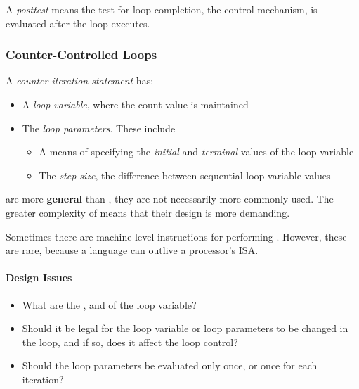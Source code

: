 \begin{definition}[Posttest]\label{def:Iterative_Statement-Posttest_Control}
  A \emph{posttest}  means the test for loop completion, the control mechanism, is evaluated after the loop  executes.
\end{definition}

\subsubsection{Counter-Controlled Loops}\label{subsubsec:Counter_Controlled_Loops}
\begin{definition}\label{def:Counter_Iteration_Statement}
  A \emph{counter iteration statement} has:
  \begin{itemize}[noitemsep]
  \item A \emph{loop variable}, where the count value is maintained
  \item The \emph{loop parameters}. These include
    \begin{itemize}[noitemsep]
    \item A means of specifying the \emph{initial} and \emph{terminal} values of the loop variable
    \item The \emph{step size}, the difference between sequential loop variable values
    \end{itemize}
  \end{itemize}
\end{definition}

 are more \textbf{general} than , they are not necessarily more commonly used.
The greater complexity of  means that their design is more demanding.

\begin{remark*}
  Sometimes there are machine-level instructions for performing .
  However, these are rare, because a language can outlive a processor's ISA.\@
\end{remark*}

\paragraph{Design Issues}\label{par:Counter_Controlled_Loops-Design_Issues}
\begin{itemize}[noitemsep]
\item What are the , and  of the loop variable?
\item Should it be legal for the loop variable or loop parameters to be changed in the loop, and if so, does it affect the loop control?
\item Should the loop parameters be evaluated only once, or once for each iteration?
\end{itemize}

